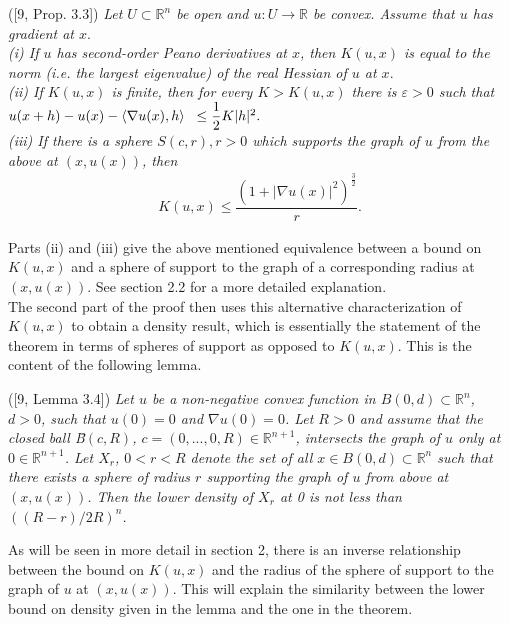 \documentclass[10pt]{article}
\newenvironment{lemma}[2][Lemma]{\begin{trivlist}
\item[\hskip \labelsep {\bfseries #1}\hskip \labelsep {\bfseries #2.}]}{\end{trivlist}}
\newenvironment{proposition}[2][Proposition]{\begin{trivlist}
\item[\hskip \labelsep {\bfseries #1}\hskip \labelsep {\bfseries #2.}]}{\end{trivlist}}
\begin{document}
\begin{proposition}{1.6}
([9, Prop. 3.3]) \textit{Let $U\subset \mathbb{R}^{n}$ be open and $u:U\rightarrow \mathbb{R}$ be convex. Assume that $u$ has gradient at $x$}.\\

\textit{(i) If $u$ has second-order Peano derivatives at $x$, then $K(u,x)$ is equal to the norm (i.e. the largest eigenvalue) of the real Hessian of $u$ at $x$}.\\

\textit{(ii) If $K(u,x)$ is finite, then for every $K>K(u,x)$ there is $\varepsilon > 0$ such that $u(x+h)-u(x)-\langle\nabla u(x),h\rangle \hspace{2mm}\leq \dfrac{1}{2}K|h|^{2}.$}\\

\textit{(iii) If there is a sphere $S(c,r), r>0$ which supports the graph of $u$ from the above at $(x,u(x))$, then 
\begin{align}
K(u,x)\leq \dfrac{(1+|\nabla u(x)|^{2})^{\frac{3}{2}}}{r}.
\end{align}}
\end{proposition}
Parts (ii) and (iii) give the above mentioned equivalence between a bound on $K(u,x)$ and a sphere of support to the graph of a corresponding radius at $(x,u(x))$. See section 2.2 for a more detailed explanation.\\

The second part of the proof then uses this alternative characterization of $K(u,x)$ to obtain a density result, which is essentially the statement of the theorem in terms of spheres of support as opposed to $K(u,x)$. This is the content of the following lemma.

\begin{lemma}{1.7} 
([9, Lemma 3.4]) \textit{Let $u$ be a non-negative convex function in $B(0,d)\subset \mathbb{R}^{n}$, $d>0$, such that $u(0)=0$ and $\nabla u(0)=0$. Let $R>0$ and assume that the closed ball \={B}$(c,R)$, $c=(0,...,0,R)\in \mathbb{R}^{n+1}$, intersects the graph of $u$ only at $0\in \mathbb{R}^{n+1}$. Let $X_{r}$, $0<r<R$ denote the set of all $x\in B(0,d)\subset \mathbb{R}^{n}$ such that there exists a sphere of radius $r$ supporting the graph of $u$ from above at $(x,u(x))$. Then the lower density of $X_{r}$ at 0 is not less than $((R-r)/2R)^{n}$.}
\end{lemma}
As will be seen in more detail in section 2, there is an inverse relationship between the bound on $K(u,x)$ and the radius of the sphere of support to the graph of $u$ at $(x,u(x))$. This will explain the similarity between the lower bound on density given in the lemma and the one in the theorem.\\
\end{document}
